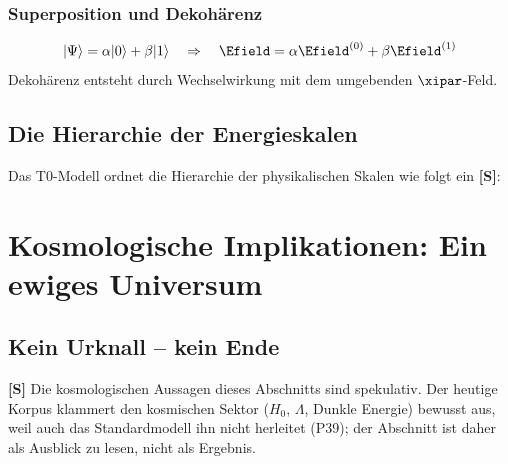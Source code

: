 	\subsubsection{Superposition und Dekohärenz}
	\begin{equation}
		|\Psi\rangle = \alpha|0\rangle + \beta|1\rangle \quad \Rightarrow \quad \Efield = \alpha \Efield^{(0)} + \beta \Efield^{(1)}
	\end{equation}
	Dekohärenz entsteht durch Wechselwirkung mit dem umgebenden $\xipar$-Feld.
	
	\subsection{Die Hierarchie der Energieskalen}
	
	Das T0-Modell ordnet die Hierarchie der physikalischen Skalen wie folgt ein \textbf{[S]}:
	
	\begin{table}[H]
		\centering
		\caption{Energieskalen-Hierarchie im T0-Modell}
	\end{table}
	
	\section{Kosmologische Implikationen: Ein ewiges Universum}
	
	\subsection{Kein Urknall -- kein Ende}
	
	\textbf{[S]} Die kosmologischen Aussagen dieses Abschnitts sind spekulativ. Der heutige Korpus klammert den kosmischen Sektor ($H_0$, $\Lambda$, Dunkle Energie) bewusst aus, weil auch das Standardmodell ihn nicht herleitet (P39); der Abschnitt ist daher als Ausblick zu lesen, nicht als Ergebnis.

